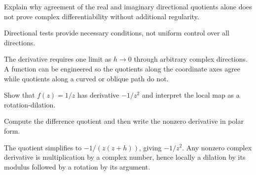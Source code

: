 \begin{exercise}\label{exr:iv01-expand-15}
Explain why agreement of the real and imaginary directional quotients alone does not prove complex differentiability without additional regularity.
\end{exercise}
\begin{hint}
Directional tests provide necessary conditions, not uniform control over all directions.
\end{hint}
\begin{solution}
The derivative requires one limit as \(h\to0\) through arbitrary complex directions. A function can be engineered so the quotients along the coordinate axes agree while quotients along a curved or oblique path do not.
\end{solution}

\begin{exercise}\label{exr:iv01-expand-16}
Show that \(f(z)=1/z\) has derivative \(-1/z^2\) and interpret the local map as a rotation-dilation.
\end{exercise}
\begin{hint}
Compute the difference quotient and then write the nonzero derivative in polar form.
\end{hint}
\begin{solution}
The quotient simplifies to \(-1/(z(z+h))\), giving \(-1/z^2\). Any nonzero complex derivative is multiplication by a complex number, hence locally a dilation by its modulus followed by a rotation by its argument.
\end{solution}

